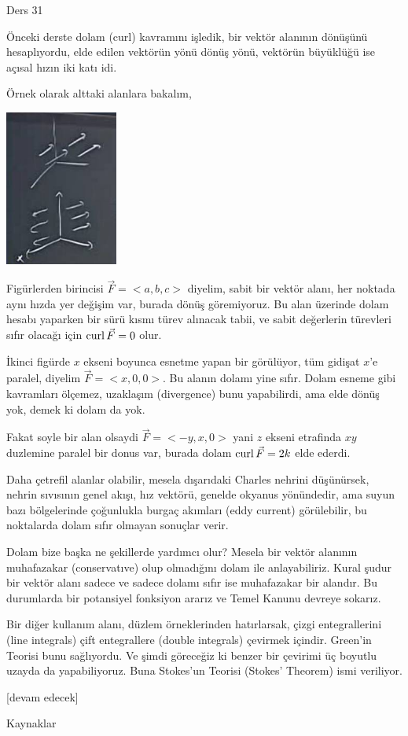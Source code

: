 \documentclass[12pt,fleqn]{article}\usepackage{../../common}
\begin{document}
Ders 31

Önceki derste dolam (curl) kavramını işledik, bir vektör alanının dönüşünü
hesaplıyordu, elde edilen vektörün yönü dönüş yönü, vektörün büyüklüğü ise
açısal hızın iki katı idi.

Örnek olarak alttaki alanlara bakalım,

\includegraphics[width=10em]{calc_multi_31_01.jpg}

Figürlerden birincisi $\vec{F} = < a,b,c > $ diyelim, sabit bir vektör
alanı, her noktada aynı hızda yer değişim var, burada dönüş göremiyoruz.
Bu alan üzerinde dolam hesabı yaparken bir sürü kısmı türev alınacak tabii,
ve sabit değerlerin türevleri sıfır olacağı için $\operatorname{curl} \vec{F} = 0$ olur.

İkinci figürde $x$ ekseni boyunca esnetme yapan bir görülüyor, tüm gidişat $x$'e
paralel, diyelim $\vec{F} = < x, 0, 0 >$. Bu alanın dolamı yine sıfır.  Dolam
esneme gibi kavramları ölçemez, uzaklaşım (divergence) bunu yapabilirdi, ama
elde dönüş yok, demek ki dolam da yok.

Fakat soyle bir alan olsaydi $\vec{F} = < -y, x, 0 >$ yani $z$ ekseni etrafinda
$xy$ duzlemine paralel bir donus var, burada dolam $\operatorname{curl} \vec{F} = 2 k$ elde
ederdi.

Daha çetrefil alanlar olabilir, mesela dışarıdaki Charles nehrini düşünürsek,
nehrin sıvısının genel akışı, hız vektörü, genelde okyanus yönündedir, ama
suyun bazı bölgelerinde çoğunlukla burgaç akımları (eddy current) görülebilir,
bu noktalarda dolam sıfır olmayan sonuçlar verir.

Dolam bize başka ne şekillerde yardımcı olur? Mesela bir vektör alanının
muhafazakar (conservatıve) olup olmadığını dolam ile anlayabiliriz. Kural şudur
bir vektör alanı sadece ve sadece dolamı sıfır ise muhafazakar bir alandır.
Bu durumlarda bir potansiyel fonksiyon ararız ve Temel Kanunu devreye sokarız.

Bir diğer kullanım alanı, düzlem örneklerinden hatırlarsak, çizgi entegrallerini
(line integrals) çift entegrallere (double integrals) çevirmek içindir. Green'in
Teorisi bunu sağlıyordu. Ve şimdi göreceğiz ki benzer bir çevirimi üç boyutlu
uzayda da yapabiliyoruz. Buna Stokes'un Teorisi (Stokes' Theorem) ismi veriliyor.

















[devam edecek]

Kaynaklar
\end{document}
